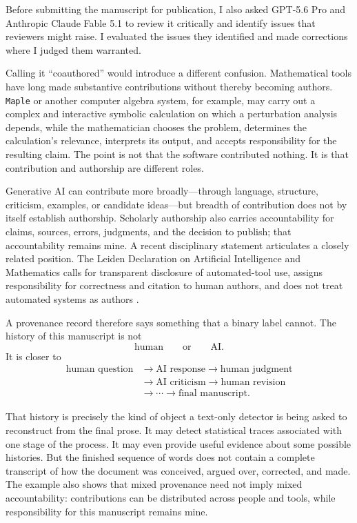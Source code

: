 \documentclass[pdflatex,sn-mathphys-num]{sn-jnl}
\begin{document}
Before submitting the manuscript for publication, I also asked GPT-5.6 Pro and Anthropic Claude Fable 5.1 
to review it critically and identify issues that reviewers might raise. I evaluated the issues they identified and 
made corrections where I judged them warranted.

Calling it ``coauthored'' would introduce a different confusion. Mathematical tools have long made
substantive contributions without thereby becoming authors. \texttt{Maple}\texttrademark{} or another 
computer algebra system, for example, may carry out a complex and interactive symbolic calculation 
on which a perturbation analysis depends, while the mathematician chooses the problem, determines the 
calculation's relevance, interprets its output, and accepts responsibility for the resulting claim. The point is not
that the software contributed nothing. It is that contribution and authorship are different roles.

Generative AI can contribute more broadly---through language, structure, criticism, examples, or
candidate ideas---but breadth of contribution does not by itself establish authorship. Scholarly
authorship also carries accountability for claims, sources, errors, judgments, and the decision to
publish; that accountability remains mine.
A recent disciplinary statement articulates a closely related position.
The Leiden Declaration on Artificial Intelligence and Mathematics calls
for transparent disclosure of automated-tool use, assigns responsibility
for correctness and citation to human authors, and does not treat automated
systems as authors \cite{LeidenDeclaration2026}.

A provenance record therefore says something that a binary label cannot. The history of this
manuscript is not
\[
\text{human}
\qquad\text{or}\qquad
\text{AI}.
\]
It is closer to
\[
\begin{aligned}
\text{human question}
&\longrightarrow \text{AI response}
\longrightarrow \text{human judgment}\\
&\longrightarrow \text{AI criticism}
\longrightarrow \text{human revision}\\
&\longrightarrow \cdots
\longrightarrow \text{final manuscript}.
\end{aligned}
\]

That history is precisely the kind of object a text-only detector is being asked to reconstruct from
the final prose. It may detect statistical traces associated with one stage of the process. It may
even provide useful evidence about some possible histories. But the finished sequence of words does
not contain a complete transcript of how the document was conceived, argued over, corrected, and
made. The example also shows that mixed provenance need not imply mixed accountability:
contributions can be distributed across people and tools, while responsibility for this manuscript
remains mine.
\end{document}
